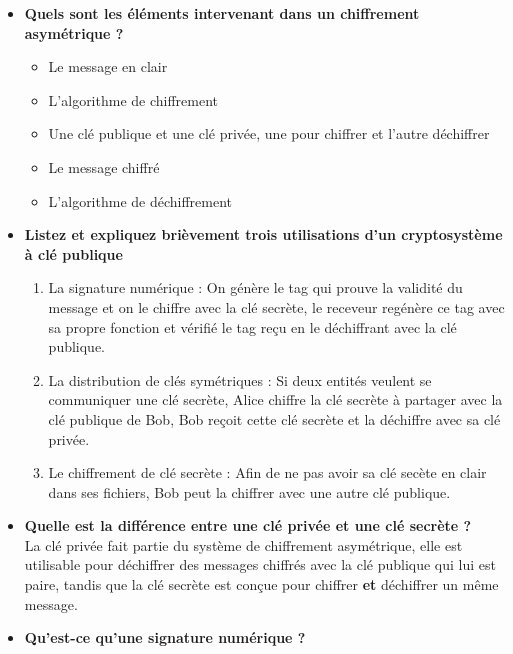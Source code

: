 \documentclass{report}
\begin{document}
\begin{itemize}
				\item \textbf{Quels sont les éléments intervenant dans un chiffrement asymétrique ?}\\

					\begin{itemize}
						\item Le message en clair
						\item L'algorithme de chiffrement
						\item Une clé publique et une clé privée, une pour chiffrer et l'autre déchiffrer
						\item Le message chiffré
						\item L'algorithme de déchiffrement\\
					\end{itemize}

				\item \textbf{Listez et expliquez brièvement trois utilisations d'un cryptosystème à clé publique}\\

					\begin{enumerate}
						\item La signature numérique : On génère le tag qui prouve la validité du message et on le chiffre avec la clé secrète, le receveur regénère ce tag avec sa propre fonction et vérifié le tag reçu en le déchiffrant avec la clé publique.
						\item La distribution de clés symétriques : Si deux entités veulent se communiquer une clé secrète, Alice chiffre la clé secrète à partager avec la clé publique de Bob, Bob reçoit cette clé secrète et la déchiffre avec sa clé privée.
						\item Le chiffrement de clé secrète : Afin de ne pas avoir sa clé secète en clair dans ses fichiers, Bob peut la chiffrer avec une autre clé publique.\\
					\end{enumerate}

				\item \textbf{Quelle est la différence entre une clé privée et une clé secrète ?}\\

					La clé privée fait partie du système de chiffrement asymétrique, elle est utilisable pour déchiffrer des messages chiffrés avec la clé publique qui lui est paire, tandis que la clé secrète est conçue pour chiffrer \textbf{et} déchiffrer un même message.\\

				\item \textbf{Qu'est-ce qu'une signature numérique ?}\\


\end{itemize}
\end{document}
